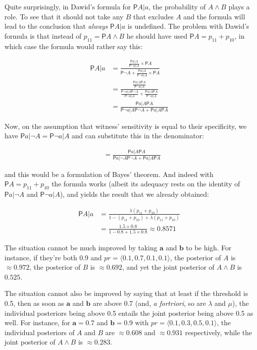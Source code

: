 \documentclass[10pt,dvipsnames,enabledeprecatedfontcommands]{scrartcl}
\newcommand{\ra}{\rangle}
\newcommand{\la}{\langle}
\newcommand{\n}{\neg}
\newcommand{\et}{\wedge}
\newcommand{\pr}{\mathsf{P}}
\begin{document}
Quite surprisingly, in Dawid's formula for \(\pr{A\vert a}\), the
probability of \(A\et B\) plays a role. To see that it should not take
any \(B\) that excludes \(A\) and the formula will lead to the
conclusion that \emph{always} \(\pr{A\vert a}\) is undefined. The
problem with Dawid's formula is that instead of \(p_{11}=\pr{A\et B}\)
he should have used \(\pr{A}=p_{11}+p_{10}\), in which case the formula
would rather say this:

\begin{align*}
\pr{A\vert a } & = \frac{\frac{\pr{a\vert A}}{\pr{\n a \vert A}}\times \pr{A}}{\pr{\n A}+ \frac{\pr{a\vert A}}{\pr{\n a \vert A}} \times \pr{A}}\\
& = \frac{\frac{\pr{a\vert A}\pr{A}}{\pr{\n a \vert A}}}{\frac{\pr{\n a\vert A}\pr{\n A}}{\pr{\n a\vert A}}+ \frac{\pr{a\vert A}\pr{A}}{\pr{\n a \vert A}}}\\
& = \frac{\pr{a\vert A}\pr{A}}{\pr{\n a\vert A}\pr{\n A} + \pr{a\vert A}\pr{A}}
\end{align*}

Now, on the assumption that witness' sensitivity is equal to their
specificity, we have \(\pr{a\vert \n A}=\pr{\n a \vert A}\) and can
substitute this in the denominator:

\begin{align*} & = \frac{\pr{a\vert A}\pr{A}}{\pr{ a\vert \n A}\pr{\n A} + \pr{a\vert A}\pr{A}}\end{align*}

and this would be a formulation of Bayes' theorem. And indeed with
\(\pr{A}=p_{11}+p_{10}\) the formula works (albeit its adequacy rests on
the identity of \(\pr{a\vert \n A}\) and \(\pr{\n a \vert A}\)), and
yields the result that we already obtained:

\begin{align*}
\pr{A\vert a} &= \frac{\lambda(p_{11}+p_{10})}{1-(p_{11}+p_{10})+\lambda(p_{11}+p_{10})}\\
&= \frac{1.5\times 0.8}{1- 0.8+1.5\times 0.8} \approx 0.8571
\end{align*}

The situation cannot be much improved by taking \(\mathbf{a}\) and
\(\mathbf{b}\) to be high. For instance, if they're both 0.9 and
\(pr=\la0.1, 0.7, 0.1, 0.1 \ra\), the posterior of \(A\) is
\(\approx 0.972\), the posterior of \(B\) is \(\approx 0.692\), and yet
the joint posterior of \(A\et B\) is \(0.525\).

The situation cannot also be improved by saying that at least if the
threshold is 0.5, then as soon as \(\mathbf{a}\) and \(\mathbf{b}\) are
above 0.7 (and, \emph{a fortriori}, so are \(\lambda\) and \(\mu\)), the
individual posteriors being above 0.5 entails the joint posterior being
above 0.5 as well. For instance, for \(\mathbf{a}=0.7\) and
\(\mathbf{b}=0.9\) with \(pr= \la 0.1, 0.3, 0.5, 0.1\ra\), the
individual posteriors of \(A\) and \(B\) are \(\approx 0.608\) and
\(\approx 0.931\) respectively, while the joint posterior of \(A\et B\)
is \(\approx 0.283\).
\end{document}
